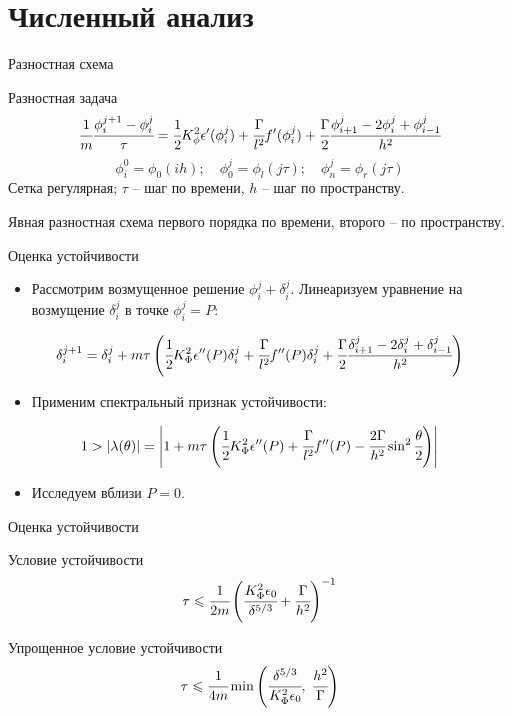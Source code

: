 \section{Численный анализ}

\begin{frame}{Разностная схема}
\begin{block}{Разностная задача}
	$$\cfrac{1}{m} \cfrac{\phi_i^{j + 1} - \phi_i^j}{\tau} = \cfrac{1}{2} K_\phi^2 \epsilon'(\phi_i^j) + \cfrac{\Gamma}{l^2} f'(\phi_i^j) + \cfrac{\Gamma}{2} \cfrac{\phi_{i + 1}^j - 2 \phi_i^j + \phi_{i - 1}^j}{h^2}$$
	$$\phi_i^0 = \phi_0(ih); \quad \phi_0^j = \phi_l(j \tau); \quad \phi_n^j = \phi_r(j \tau)$$
	Сетка регулярная; $\tau$ -- шаг по времени, $h$ -- шаг по пространству.
\end{block}
Явная разностная схема первого порядка по времени, второго -- по пространству.
\end{frame}


\begin{frame}{Оценка устойчивости}
\begin{itemize}
	\item Рассмотрим возмущенное решение $\phi_i^j + \delta_i^j$. Линеаризуем уравнение на возмущение $\delta_i^j$ в точке $\phi_i^j = P$:
\end{itemize}
$$\delta_i^{j + 1} = \delta_i^j + m \tau \left( \cfrac{1}{2} K_\Phi^2 \epsilon''(P) \delta_i^j + \cfrac{\Gamma}{l^2} f''(P) \delta_i^j + \cfrac{\Gamma}{2} \cfrac{\delta_{i + 1}^j - 2 \delta_i^j + \delta_{i - 1}^j}{h^2} \right)$$
\begin{itemize}
	\item Применим спектральный признак устойчивости:
\end{itemize}
$$1 > | \lambda(\theta) | = \left| 1 + m \tau \left( \cfrac{1}{2} K_\Phi^2 \epsilon''(P) + \cfrac{\Gamma}{l^2} f''(P) - \cfrac{2 \Gamma}{h^2} \sin^2 \cfrac{\theta}{2} \right) \right|$$
\begin{itemize}
	\item Исследуем вблизи $P = 0$.
\end{itemize}
\end{frame}


\begin{frame}{Оценка устойчивости}
\begin{block}{Условие устойчивости}
	$$\tau \leqslant \cfrac{1}{2 m} \left( \cfrac{K_\Phi^2 \epsilon_0}{\delta^{5/3}} +
	\cfrac{\Gamma}{h^2} \right)^{-1}$$
\end{block}
\begin{block}{Упрощенное условие устойчивости}
	$$\tau \leqslant \cfrac{1}{4 m} \min \left(\cfrac{\delta^{5/3}}{K_\Phi^2 \epsilon_0}, \;
	\cfrac{h^2}{\Gamma} \right)$$
\end{block}
\end{frame}


